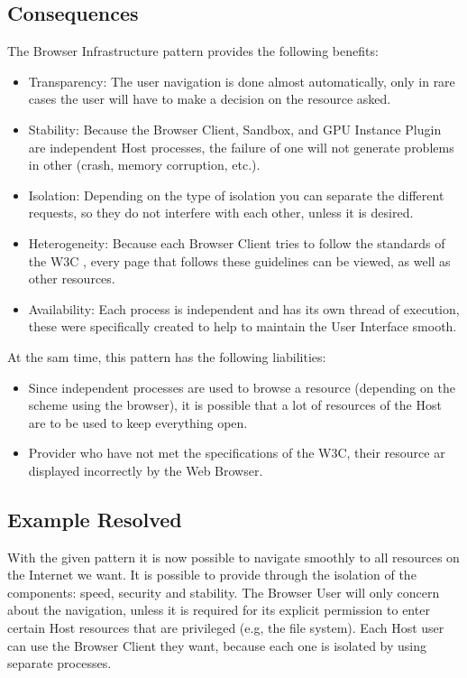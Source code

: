 \documentclass{sig-alternate-05-2015}
\begin{document}
  \subsection*{Consequences}
  The Browser Infrastructure pattern provides the following benefits:
  \begin{itemize}
    \item Transparency: The user navigation is done almost automatically, only in rare cases the user will have to make a decision on the resource asked.
    \item Stability: Because the Browser Client, Sandbox, and GPU Instance Plugin are independent Host processes, the failure of one will not generate problems in other (crash, memory corruption, etc.).
    \item Isolation: Depending on the type of isolation you can separate the different requests, so they do not interfere with each other, unless it is desired.
    \item Heterogeneity: Because each Browser Client tries to follow the standards of the W3C \cite{w3c}, every page that follows these guidelines can be viewed, as well as other resources.
    \item Availability: Each process is independent and has its own thread of execution, these were specifically created to help to maintain the User Interface smooth.
  \end{itemize}
  At the sam time, this pattern has the following liabilities:
  \begin{itemize}
    \item Since independent processes are used to browse a resource (depending on the scheme using the browser), it is possible that a lot of resources of the Host are to be used to keep everything open.
    \item Provider who have not met the specifications of the W3C, their resource ar displayed incorrectly by the Web Browser.
  \end{itemize}

  \subsection*{Example Resolved}
With the given pattern it is now possible to navigate smoothly to all resources on the Internet we want. It is possible to provide through the isolation of the components: speed, security and stability. The Browser User will only concern about the navigation, unless it is required for its explicit permission to enter certain Host resources that are privileged (e.g, the file system). Each Host user can use the Browser Client they want, because each one is isolated by using separate processes.
\end{document}
